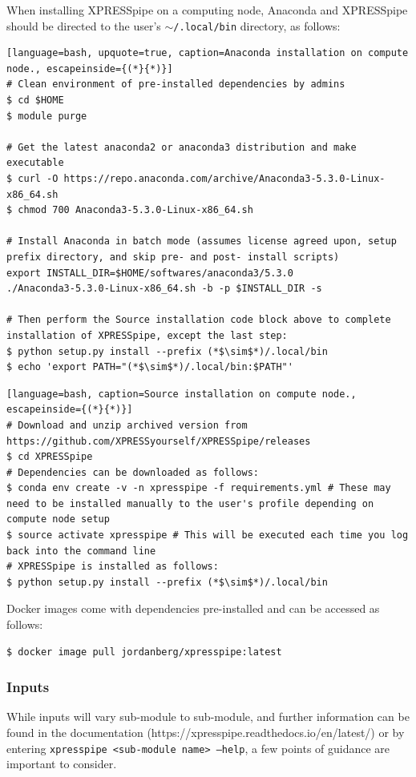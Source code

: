 \documentclass[11pt, a4paper, oneside]{article}
\begin{document}
When installing XPRESSpipe on a computing node, Anaconda and XPRESSpipe should be directed to the user's \texttt{$\sim$/.local/bin} directory, as follows:

\begin{lstlisting}[language=bash, upquote=true, caption=Anaconda installation on compute node., escapeinside={(*}{*)}]
# Clean environment of pre-installed dependencies by admins
$ cd $HOME
$ module purge

# Get the latest anaconda2 or anaconda3 distribution and make executable
$ curl -O https://repo.anaconda.com/archive/Anaconda3-5.3.0-Linux-x86_64.sh
$ chmod 700 Anaconda3-5.3.0-Linux-x86_64.sh

# Install Anaconda in batch mode (assumes license agreed upon, setup prefix directory, and skip pre- and post- install scripts)
export INSTALL_DIR=$HOME/softwares/anaconda3/5.3.0
./Anaconda3-5.3.0-Linux-x86_64.sh -b -p $INSTALL_DIR -s

# Then perform the Source installation code block above to complete installation of XPRESSpipe, except the last step:
$ python setup.py install --prefix (*$\sim$*)/.local/bin
$ echo 'export PATH="(*$\sim$*)/.local/bin:$PATH"'
\end{lstlisting}


\begin{lstlisting}[language=bash, caption=Source installation on compute node., escapeinside={(*}{*)}]
# Download and unzip archived version from https://github.com/XPRESSyourself/XPRESSpipe/releases
$ cd XPRESSpipe
# Dependencies can be downloaded as follows:
$ conda env create -v -n xpresspipe -f requirements.yml # These may need to be installed manually to the user's profile depending on compute node setup
$ source activate xpresspipe # This will be executed each time you log back into the command line
# XPRESSpipe is installed as follows:
$ python setup.py install --prefix (*$\sim$*)/.local/bin
\end{lstlisting}

Docker images come with dependencies pre-installed and can be accessed as follows:

\begin{lstlisting}[language=bash, caption=Docker installation]
$ docker image pull jordanberg/xpresspipe:latest
\end{lstlisting}

\subsubsection{Inputs}
While inputs will vary sub-module to sub-module, and further information can be found in the documentation (https://xpresspipe.readthedocs.io/en/latest/) or by entering \texttt{xpresspipe \textless sub-module name\textgreater \ --help}, a few points of guidance are important to consider.
\end{document}
